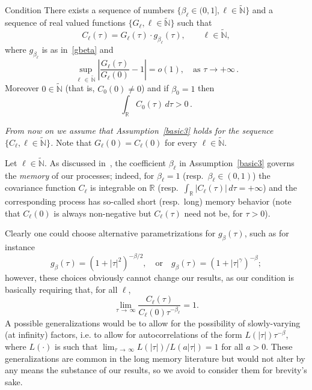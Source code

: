 \documentclass[AHL,Unicode,longabstracts,published]{cedram}
\newcommand{\bbR}{\mathbb{R}}
\newcommand{\bbN}{\mathbb{N}}
\begin{document}
\begin{enonce}{Condition}\label{basic3}
There exists a sequence of numbers $\{ \beta_\ell\in (0,1], \ell
\in \widetilde{\bbN}\}$ and a sequence of real valued functions $\{ G_\ell, \ell
\in \widetilde{\bbN}\}$ such that
\begin{equation*}
C_\ell(\tau) = G_\ell(\tau) \cdot g_{\beta_\ell}(\tau), \qquad \ell\in
\widetilde{\bbN},
\end{equation*}
where $g_{\beta_\ell}$ is as in~\eqref{gbeta} and
\begin{equation*}
\sup_{\ell\,\in\,\widetilde{\bbN}} \left|\frac{G_\ell(\tau)}{G_\ell(0)} - 1\right| = o(1), \quad \text{as }\tau\to +\infty\,.
\end{equation*}
Moreover $0\in \widetilde{\bbN}$ (that is, $C_0(0)\ne 0$) and if $
\beta_0=1$ then
\begin{equation*}
\int_{\bbR} C_0 (\tau)\, d\tau > 0\,.
\end{equation*}
\end{enonce}

\emph{From now on we assume that Assumption~\ref{basic3} holds for the sequence $\{ C_\ell, \ell\in \widetilde{\bbN}\}$.} Note that $G_\ell(0)=C_\ell(0)$ for every $\ell\in \widetilde{\bbN}$.

Let $\ell\in \widetilde{\bbN}$. As discussed in~\cite{MRV:20}, the coefficient $\beta_{\ell }$ in Assumption~\ref{basic3} governs the \emph{ memory} of our processes; indeed, for $\beta_{\ell }=1$ (resp.~$
\beta_\ell\in (0,1)$) the covariance function $C_{\ell }$ is integrable on $\bbR$ (resp.~$\int_{\bbR} |C_\ell(\tau)|\,d\tau = +\infty$) and the corresponding process has so-called short (resp.~long) memory behavior (note that $C_\ell(0)$ is always non-negative but $C_\ell(\tau)$ need not be, for $\tau>0 $).

Clearly one could choose alternative parametrizations for $g_\beta(\tau)$, such as for instance
\begin{equation*}
g_\beta(\tau) =\left(1 + |\tau|^2\right)^{-\beta/2},\quad \text{or} \quad g_\beta(\tau) =\left(1 + |\tau|^{\gamma}\right)^{-\beta};
\end{equation*}
however, these choices obviously cannot change our results, as our condition is basically requiring that, for all $\ell$,
\begin{equation*}
\lim_{\tau\,\rightarrow\,\infty}\frac{C_\ell(\tau)}{C_\ell(0)\tau^{-\beta_\ell}} =1.
\end{equation*}
A possible generalizations would be to allow for the possibility of slowly-varying (at infinity) factors, i.e. to allow for autocorrelations of the form $ L(|\tau|)\tau^{-\beta}$, where $L(\cdot)$ is such that $\lim_{\tau\,\rightarrow\,\infty} L(|\tau|)/L(a|\tau|)=1$ for all $a>0$. These generalizations are common in the long memory literature but would not alter by any means the substance of our results, so we avoid to consider them for brevity's sake.
\end{document}
